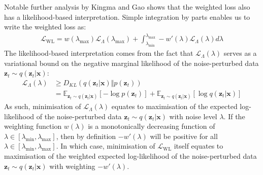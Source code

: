 \documentclass[ oneside,%
                    author={George Herbert},
                    degree={MSci},
                     title={Video Diffusion Models for Climate Simulations},
                  subtitle={}]{dissertation}
\begin{document}
Notable further analysis by Kingma and Gao \cite{Understanding_Diffusion_Objective_Kingma} shows that the weighted loss also has a likelihood-based interpretation. Simple integration by parts enables us to write the weighted loss as:
\begin{align}
      \mathcal{L}_{\mathrm{WL}} = w(\lambda_{\max})\mathcal{L}_\Lambda(\lambda_{\max}) + \int_{\lambda_{\min}}^{\lambda_{\max}}-w'(\lambda)\mathcal{L}_\Lambda(\lambda) d\lambda
\end{align}
The likelihood-based interpretation comes from the fact that $\mathcal{L}_\Lambda(\lambda)$ serves as a variational bound on the negative marginal likelihood of the noise-perturbed data $\mathbf{z}_t\sim q(\mathbf{z}_t|\mathbf{x})$:
\begin{align}
      \mathcal{L}_\Lambda(\lambda)&\ge D_{KL}(q(\mathbf{z}_t|\mathbf{x})\Vert p(\mathbf{z}_t))\\
      &=\mathbb{E}_{\mathbf{z}_t\sim q(\mathbf{z}_t|\mathbf{x})}\left[-\log p(\mathbf{z}_t)\right]+\mathbb{E}_{\mathbf{z}_t\sim q(\mathbf{z}_t|\mathbf{x})}\left[\log q(\mathbf{z}_t|\mathbf{x})\right]
\end{align}
As such, minimisation of $\mathcal{L}_\Lambda(\lambda)$ equates to maximisation of the expected log-likelihood of the noise-perturbed data $\mathbf{z}_t\sim q(\mathbf{z}_t|\mathbf{x})$ with noise level $\lambda$. If the weighting function $w(\lambda)$ is a monotonically decreasing function of $\lambda\in [\lambda_{\min}, \lambda_{\max}]$, then by definition $-w'(\lambda)$ will be positive for all $\lambda\in [\lambda_{\min}, \lambda_{\max}]$. In which case, minimisation of $\mathcal{L}_{\mathrm{WL}}$ itself equates to maximisation of the weighted expected log-likelihood of the noise-perturbed data $\mathbf{z}_t\sim q(\mathbf{z}_t|\mathbf{x})$ with weighting $-w'(\lambda)$. 
\end{document}
